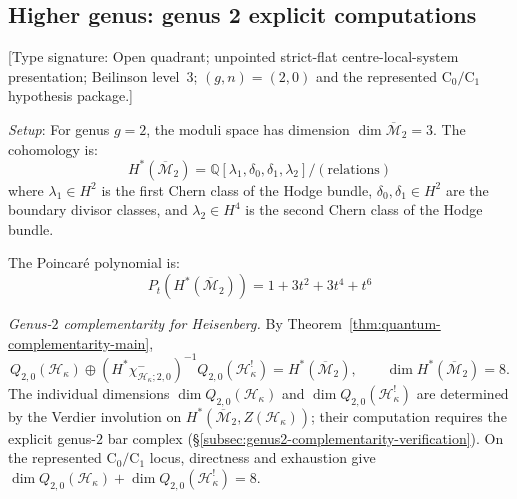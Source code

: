 \subsection{Higher genus: genus 2 explicit computations}

\begin{example}
\label{ex:heisenberg-genus-2-complementarity}
\textup{[Type signature: Open quadrant; unpointed strict-flat
centre-local-system presentation; Beilinson level~3;
\((g,n)=(2,0)\) and the represented \(\mathrm C_0/\mathrm C_1\)
hypothesis package.]}

\emph{Setup}: For genus $g=2$, the moduli space has dimension $\dim \overline{
\mathcal{M}}_2 = 3$. The cohomology is:
\begin{equation}
H^*(\overline{\mathcal{M}}_2) = \mathbb{Q}[\lambda_1, \delta_0, \delta_1, \lambda_2] / (\text{relations})
\end{equation}
where $\lambda_1 \in H^2$ is the first Chern class of the Hodge bundle,
$\delta_0, \delta_1 \in H^2$ are the boundary divisor classes, and
$\lambda_2 \in H^4$ is the second Chern class of the Hodge bundle.

The Poincaré polynomial is:
\begin{equation}
P_t(H^*(\overline{\mathcal{M}}_2)) = 1 + 3t^2 + 3t^4 + t^6
\end{equation}

\emph{Genus-$2$ complementarity for Heisenberg.}
By Theorem~\ref{thm:quantum-complementarity-main},
\begin{equation}
Q_{2,0}(\mathcal{H}_\kappa)\oplus
(H^*\chi^-_{\mathcal H_\kappa;2,0})^{-1}
Q_{2,0}(\mathcal{H}_\kappa^!)
= H^*(\overline{\mathcal{M}}_2),
\qquad
\dim H^*(\overline{\mathcal{M}}_2) = 8.
\end{equation}
The individual dimensions
$\dim Q_{2,0}(\mathcal{H}_\kappa)$ and $\dim Q_{2,0}(\mathcal{H}_\kappa^!)$
are determined by the Verdier involution on
$H^*(\overline{\mathcal{M}}_2, Z(\mathcal{H}_\kappa))$; their
computation requires the explicit genus-$2$ bar complex
(\S\ref{subsec:genus2-complementarity-verification}).
On the represented \(\mathrm C_0/\mathrm C_1\) locus, directness and
exhaustion give
$\dim Q_{2,0}(\mathcal H_\kappa)+
\dim Q_{2,0}(\mathcal H_\kappa^!)=8$.
\end{example}

